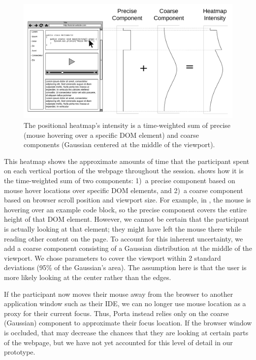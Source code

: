 \begin{figure}[h!]
  \centering
  \includegraphics[width=0.9\columnwidth]{figures/porta/heatmap}

\vspace{-0.75em}

  \caption{The positional heatmap's intensity is a time-weighted sum of
  precise (mouse hovering over a specific DOM element) and coarse
  components (Gaussian centered at the middle of the viewport).}

  \label{fig:pos-heatmap}
  \vspace{-0.5em} %
\end{figure}


This heatmap shows the approximate amounts of time that the participant
spent on each vertical portion of the webpage throughout the session.
 shows how it is the time-weighted sum of two
components: 1)~a precise component based on mouse hover locations over
specific DOM elements, and 2)~a coarse component based on browser scroll
position and viewport size. For example, in , the
mouse is hovering over an example code block, so the precise component
covers the entire height of that DOM element. However, we cannot be
certain that the participant is actually looking at that element; they
might have left the mouse there while reading other content on the page.
To account for this inherent uncertainty, we add a coarse component
consisting of a Gaussian distribution at the middle of the viewport. We
chose parameters to cover the viewport within 2 standard deviations
(95\% of the Gaussian's area). The assumption here is that the user is
more likely looking at the center rather than the edges.


If the participant now moves their mouse away from the browser to
another application window such as their IDE, we can no longer use mouse
location as a proxy for their current focus. Thus, Porta instead relies
only on the coarse (Gaussian) component to approximate their focus
location.
%
If the browser window is occluded, that may decrease the chances that
they are looking at certain parts of the webpage, but we have not yet
accounted for this level of detail in our prototype.

